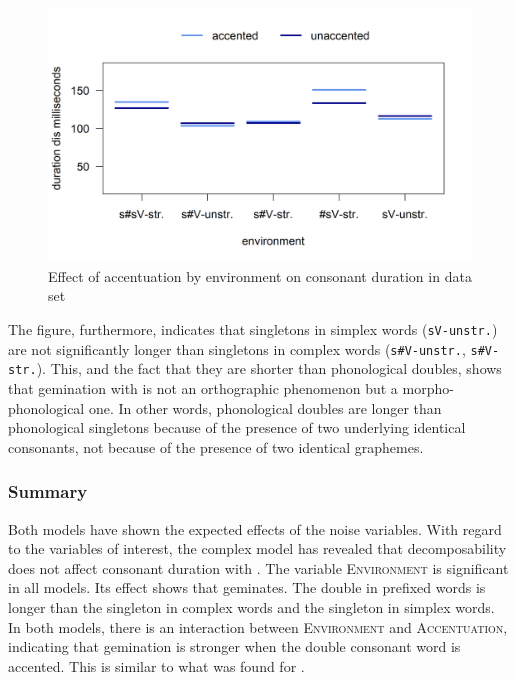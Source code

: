 \begin{figure} [h!]
	\centering
	\includegraphics [scale=0.5] {images/Experiment/disModelCompleteinterEnvAcc}
	\caption{Effect of accentuation by environment on consonant duration in data set}
	\label{fig:  dis experiment Env and accent}
\end{figure}


The figure, furthermore, indicates that singletons in simplex words (\texttt{sV-unstr.}) are not significantly longer than singletons in complex words (\texttt{s\#V-unstr.}, \texttt{s\#V- str.}). This, and the fact that they are shorter than phonological doubles, shows that gemination with  is not an orthographic phenomenon but a morpho-phonological one. In other words, phonological doubles are longer than phonological singletons because of the presence of two underlying identical consonants, not because of the presence of two identical graphemes.



\subsubsection{Summary}

Both models have shown the expected effects of the noise variables. With regard to the variables of interest, the complex model has revealed that decomposability does not affect consonant duration with . The variable \textsc{Environment} is significant in all models. Its effect shows that  geminates. The double in prefixed words is longer than the singleton in complex words and the singleton in simplex words. 
In both models, there is an interaction between \textsc{Environment} and \textsc{Accentuation}, indicating that gemination is stronger when the double consonant word is accented. This is similar to what was found for .

